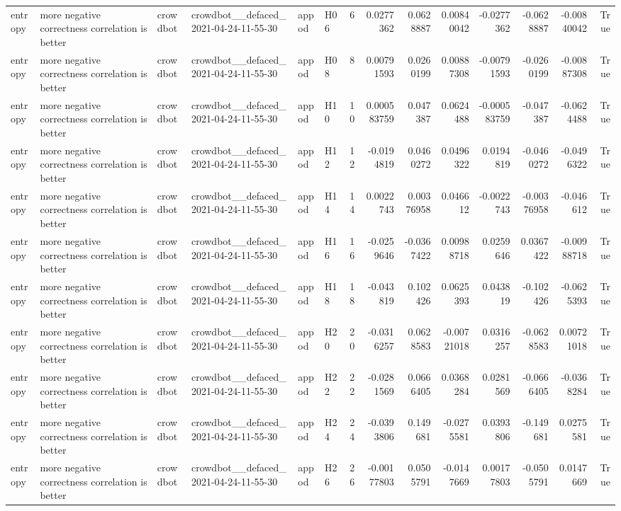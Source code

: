 \begin{longtable}{llllllrrrrrrrr}
entropy & more negative correctness correlation is better & crowdbot & crowdbot\_\_defaced\_2021-04-24-11-55-30 & appod & H06 & 6 & 0.0277362 & 0.0628887 & 0.00840042 & -0.0277362 & -0.0628887 & -0.00840042 & True \\
entropy & more negative correctness correlation is better & crowdbot & crowdbot\_\_defaced\_2021-04-24-11-55-30 & appod & H08 & 8 & 0.00791593 & 0.0260199 & 0.00887308 & -0.00791593 & -0.0260199 & -0.00887308 & True \\
entropy & more negative correctness correlation is better & crowdbot & crowdbot\_\_defaced\_2021-04-24-11-55-30 & appod & H10 & 10 & 0.000583759 & 0.047387 & 0.0624488 & -0.000583759 & -0.047387 & -0.0624488 & True \\
entropy & more negative correctness correlation is better & crowdbot & crowdbot\_\_defaced\_2021-04-24-11-55-30 & appod & H12 & 12 & -0.0194819 & 0.0460272 & 0.0496322 & 0.0194819 & -0.0460272 & -0.0496322 & True \\
entropy & more negative correctness correlation is better & crowdbot & crowdbot\_\_defaced\_2021-04-24-11-55-30 & appod & H14 & 14 & 0.0022743 & 0.00376958 & 0.046612 & -0.0022743 & -0.00376958 & -0.046612 & True \\
entropy & more negative correctness correlation is better & crowdbot & crowdbot\_\_defaced\_2021-04-24-11-55-30 & appod & H16 & 16 & -0.0259646 & -0.0367422 & 0.00988718 & 0.0259646 & 0.0367422 & -0.00988718 & True \\
entropy & more negative correctness correlation is better & crowdbot & crowdbot\_\_defaced\_2021-04-24-11-55-30 & appod & H18 & 18 & -0.043819 & 0.102426 & 0.0625393 & 0.043819 & -0.102426 & -0.0625393 & True \\
entropy & more negative correctness correlation is better & crowdbot & crowdbot\_\_defaced\_2021-04-24-11-55-30 & appod & H20 & 20 & -0.0316257 & 0.0628583 & -0.00721018 & 0.0316257 & -0.0628583 & 0.00721018 & True \\
entropy & more negative correctness correlation is better & crowdbot & crowdbot\_\_defaced\_2021-04-24-11-55-30 & appod & H22 & 22 & -0.0281569 & 0.0666405 & 0.0368284 & 0.0281569 & -0.0666405 & -0.0368284 & True \\
entropy & more negative correctness correlation is better & crowdbot & crowdbot\_\_defaced\_2021-04-24-11-55-30 & appod & H24 & 24 & -0.0393806 & 0.149681 & -0.0275581 & 0.0393806 & -0.149681 & 0.0275581 & True \\
entropy & more negative correctness correlation is better & crowdbot & crowdbot\_\_defaced\_2021-04-24-11-55-30 & appod & H26 & 26 & -0.00177803 & 0.0505791 & -0.0147669 & 0.00177803 & -0.0505791 & 0.0147669 & True \\

\end{longtable}
